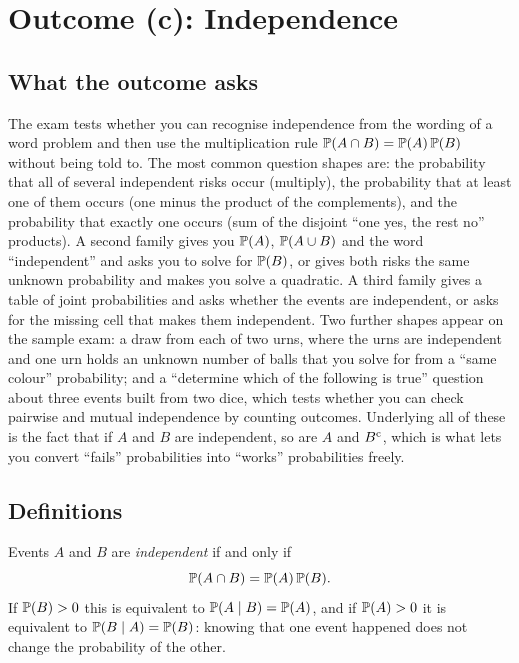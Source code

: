 \section{Outcome (c): Independence}

\subsection{What the outcome asks}

The exam tests whether you can recognise independence from the wording of a word problem and then use the multiplication rule $\mathbb{P}(A \cap B) = \mathbb{P}(A)\,\mathbb{P}(B)$ without being told to. The most common question shapes are: the probability that all of several independent risks occur (multiply), the probability that at least one of them occurs (one minus the product of the complements), and the probability that exactly one occurs (sum of the disjoint ``one yes, the rest no'' products). A second family gives you $\mathbb{P}(A)$, $\mathbb{P}(A \cup B)$ and the word ``independent'' and asks you to solve for $\mathbb{P}(B)$, or gives both risks the same unknown probability and makes you solve a quadratic. A third family gives a table of joint probabilities and asks whether the events are independent, or asks for the missing cell that makes them independent. Two further shapes appear on the sample exam: a draw from each of two urns, where the urns are independent and one urn holds an unknown number of balls that you solve for from a ``same colour'' probability; and a ``determine which of the following is true'' question about three events built from two dice, which tests whether you can check pairwise and mutual independence by counting outcomes. Underlying all of these is the fact that if $A$ and $B$ are independent, so are $A$ and $B^{\mathrm{c}}$, which is what lets you convert ``fails'' probabilities into ``works'' probabilities freely.

\subsection{Definitions}

\begin{keyfact}
Events $A$ and $B$ are \emph{independent} if and only if
\[
\mathbb{P}(A \cap B) = \mathbb{P}(A)\,\mathbb{P}(B).
\]
If $\mathbb{P}(B) > 0$ this is equivalent to $\mathbb{P}(A \mid B) = \mathbb{P}(A)$, and if $\mathbb{P}(A) > 0$ it is equivalent to $\mathbb{P}(B \mid A) = \mathbb{P}(B)$: knowing that one event happened does not change the probability of the other.
\end{keyfact}

